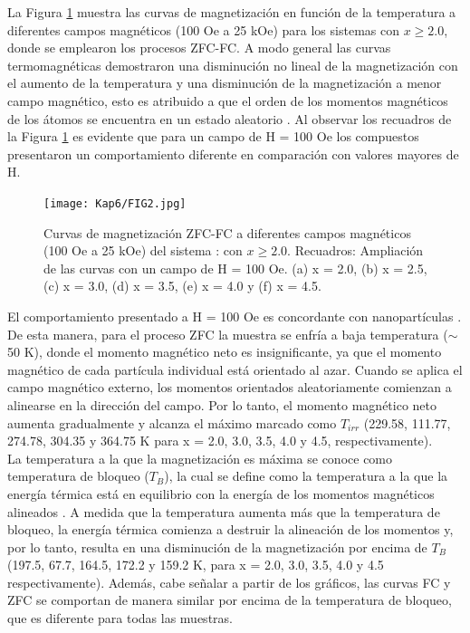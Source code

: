 La Figura \ref{fig:zfc} muestra las curvas de magnetización en función de la
temperatura a
diferentes campos magnéticos (100 Oe a 25 kOe) para los sistemas con $x \geq
    2.0$,
donde se emplearon los procesos ZFC-FC. A modo general las curvas
termomagnéticas demostraron una disminución no lineal de la magnetización con
el aumento de la temperatura y una disminución de la magnetización a menor
campo magnético, esto es atribuido a que el orden de los momentos magnéticos de
los átomos se encuentra en un estado aleatorio \cite{ramesh20173}. Al observar los
recuadros de la Figura \ref{fig:zfc}
es evidente que para un campo de H = 100 Oe los compuestos presentaron un
comportamiento
diferente en comparación con valores mayores de H.\\

\begin{figure}[H]
    \centering%

    \texttt{[image: Kap6/FIG2.jpg]}%
    \caption{Curvas de magnetización ZFC-FC a diferentes campos magnéticos (100
    Oe a 25 kOe) del sistema : con $x \geq
        2.0$. Recuadros: Ampliación de las curvas con un campo de H = 100 Oe. (a) x =
    2.0, (b) x = 2.5, (c) x = 3.0, (d) x = 3.5, (e) x = 4.0 y (f) x = 4.5. }
    \label{fig:zfc}
\end{figure}

El comportamiento presentado a H = 100 Oe es concordante con nanopartículas
\@{}
\cite{singh2017shape,gaona2021characterization}. De esta manera, para el proceso ZFC la muestra se enfría a baja
temperatura ($\sim $ 50 K), donde el momento magnético neto es insignificante,
ya que
el momento magnético de cada partícula individual está orientado al azar.
Cuando se aplica el campo magnético externo, los momentos orientados
aleatoriamente comienzan a alinearse en la dirección del campo. Por lo tanto,
el momento magnético neto aumenta gradualmente y alcanza el máximo marcado como
$T_{irr}$ (229.58, 111.77, 274.78, 304.35 y 364.75 K para x = 2.0, 3.0, 3.5,
4.0 y
4.5, respectivamente).\\

La temperatura a la que la magnetización es máxima se conoce como temperatura
de bloqueo ($T_B$), la cual se define como la temperatura a la que la energía
térmica está en equilibrio con la energía de los momentos magnéticos alineados
\cite{shao2018preparation}.
A medida que la temperatura aumenta más que la temperatura de bloqueo, la
energía térmica comienza a destruir la alineación de los momentos y, por lo
tanto, resulta en una disminución de la magnetización por encima de $T_B$
(197.5,
67.7, 164.5, 172.2 y 159.2 K, para x = 2.0, 3.0, 3.5, 4.0 y 4.5
respectivamente).
Además, cabe señalar a partir de los gráficos, las curvas FC
y ZFC se comportan de manera similar por encima de la temperatura de bloqueo,
que es diferente para todas las muestras.\\

